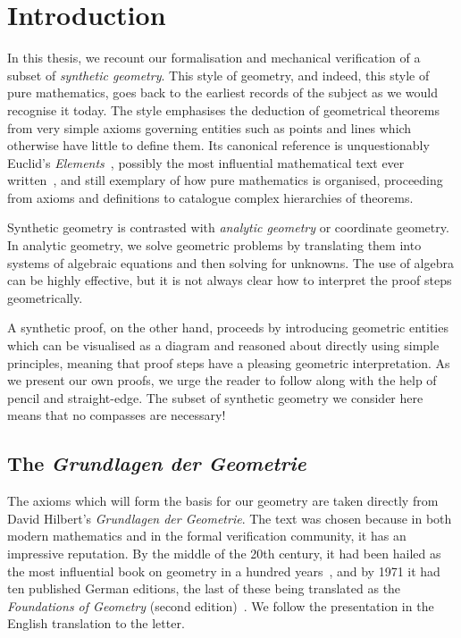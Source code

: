 \chapter{Introduction}\label{chapter:Introduction}
In this thesis, we recount our formalisation and mechanical verification of a subset of \emph{synthetic geometry}. This style of geometry, and indeed, this style of pure mathematics, goes back to the earliest records of the subject as we would recognise it today. The style emphasises the deduction of geometrical theorems from very simple axioms governing entities such as points and lines which otherwise have little to define them. Its canonical reference is unquestionably Euclid's \emph{Elements}~\cite{HeathElements}, possibly the most influential mathematical text ever written~\cite{BoyerEuclidInfluence}, and still exemplary of how pure mathematics is organised, proceeding from axioms and definitions to catalogue complex hierarchies of theorems.

Synthetic geometry is contrasted with \emph{analytic geometry} or coordinate geometry. In analytic geometry, we solve geometric problems by translating them into systems of algebraic equations and then solving for unknowns. The use of algebra can be highly effective, but it is not always clear how to interpret the proof steps geometrically.

A synthetic proof, on the other hand, proceeds by introducing geometric entities which can be visualised as a diagram and reasoned about directly using simple principles, meaning that proof steps have a pleasing geometric interpretation. As we present our own proofs, we urge the reader to follow along with the help of pencil and straight-edge. The subset of synthetic geometry we consider here means that no compasses are necessary!

\section{The \emph{Grundlagen der Geometrie}}
The axioms which will form the basis for our geometry are taken directly from David Hilbert's \emph{Grundlagen der Geometrie}. The text was chosen because in both modern mathematics and in the formal verification community, it has an impressive reputation. By the middle of the 20th century, it had been hailed as the most influential book on geometry in a hundred years~\cite{BirkhoffHilbertInfluence}, and by 1971 it had ten published German editions, the last of these being translated as the \emph{Foundations of Geometry} (second edition)~\cite{FoundationsOfGeometry}. We follow the presentation in the English translation to the letter. 

